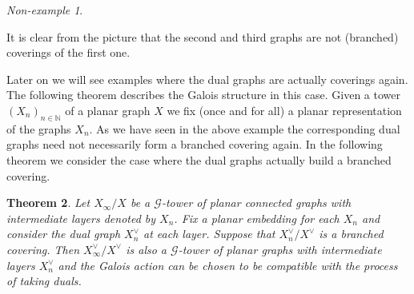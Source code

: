 \documentclass{amsart}
\newtheorem{theorem}{Theorem}[section]
\numberwithin{equation}{section}
\theoremstyle{remark}
\newtheorem{nexample}[theorem]{Non-example}
\theoremstyle{plain} %
\begin{document}
\begin{nexample}
\begin{center}
\end{center}
It is clear from the picture that the second and third graphs are not (branched) coverings of the first one. 
\end{nexample}


Later on we will see examples where the dual graphs are actually coverings again.
The following theorem describes the Galois structure in this case.
{Given a tower $(X_n)_{n\in \mathbb{N}}$ of a planar graph $X$ we fix (once and for all) a planar representation of the graphs $X_n$.
As we have seen in the above example the corresponding dual graphs need not necessarily form a branched covering again.
In the following theorem we consider the case where the dual graphs actually build a branched covering.}

\begin{theorem}
\label{dual graph theorem}
Let $X_\infty/X$ be a $\mathcal{G}$-tower of planar connected graphs with intermediate layers denoted by $X_n$. 
{Fix a planar embedding for each $X_n$ and consider the dual graph $X^\vee_n$ at each layer.
Suppose} that $X_n^\vee/X^\vee$ is a branched covering.
Then $X_\infty^\vee/X^\vee$ is also a $\mathcal{G}$-tower of planar graphs with intermediate layers $X_n^\vee$ and the Galois action can be chosen to be compatible with the process of taking duals.
\end{theorem}
\end{document}
